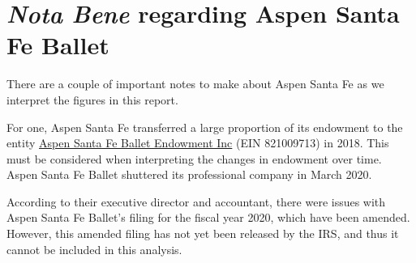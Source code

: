 \documentclass[Dance Data
Project,article,submit,moreauthors,pdftex]{mdpi}
\begin{document}
\hypertarget{asfb}{%
\section{\texorpdfstring{\emph{Nota Bene} regarding Aspen Santa Fe
Ballet}{Nota Bene regarding Aspen Santa Fe Ballet}}\label{asfb}}

\label{sec:asfb}

There are a couple of important notes to make about Aspen Santa Fe as we
interpret the figures in this report.

For one, Aspen Santa Fe transferred a large proportion of its endowment
to the entity
\href{https://projects.propublica.org/nonprofits/organizations/821009713}{Aspen
Santa Fe Ballet Endowment Inc} (EIN 821009713) in 2018. This must be
considered when interpreting the changes in endowment over time. Aspen
Santa Fe Ballet shuttered its professional company in March 2020.

According to their executive director and accountant, there were issues
with Aspen Santa Fe Ballet's filing for the fiscal year 2020, which have
been amended. However, this amended filing has not yet been released by
the IRS, and thus it cannot be included in this analysis.
\end{document}

